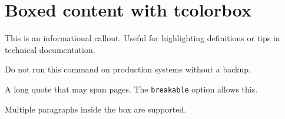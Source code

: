 \documentclass{article}
\begin{document}
\section{Boxed content with tcolorbox}

\begin{tcolorbox}[colback=blue!5,colframe=blue!75,title=Info]
This is an informational callout. Useful for highlighting definitions or tips in technical documentation.
\end{tcolorbox}

\begin{tcolorbox}[colback=red!5,colframe=red!75,title=Warning]
Do not run this command on production systems without a backup.
\end{tcolorbox}

\begin{tcolorbox}[breakable,title=Long content]
A long quote that may span pages. The \texttt{breakable} option allows this.

Multiple paragraphs inside the box are supported.
\end{tcolorbox}
\end{document}
